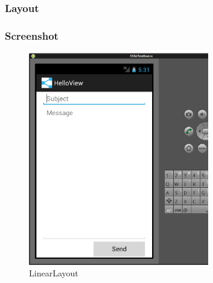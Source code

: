 \begin{frame}
   \frametitle{Layout}
   
\end{frame}

\begin{frame}
   \frametitle{Screenshot}
   \begin{figure}[h!]
     \centering
     \includegraphics[width=0.7\textwidth]{pictures/linear_layout.ps}
     \caption{
        LinearLayout
     }
     \label{fig:linear_layout}
   \end{figure}
\end{frame}

